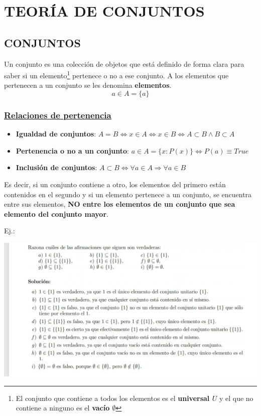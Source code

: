 \documentclass[10pt,a4paper,openright]{book}
\begin{document}
\chapter*{TEORÍA DE CONJUNTOS}
\section*{CONJUNTOS}
Un conjunto es una colección de objetos que está definido de forma clara para saber si un elemento\footnote{El conjunto que contiene a todos los elementos es el \textbf{universal $U$} y el que no contiene a ninguno es el \textbf{vacío $\emptyset$}} pertenece o no a ese conjunto. A los elementos que pertenecen a un conjunto se les denomina \textbf{elementos}.
$$a\in A=\{a\}$$

\subsection*{\underline{Relaciones de pertenencia}}
\begin{itemize}
\item \textbf{Igualdad de conjuntos}: $A=B\Leftrightarrow x\in A\Leftrightarrow x\in B\Leftrightarrow A\subset B\wedge B\subset A$
\item \textbf{Pertenencia o no a un conjunto}: $a\in A=\{x: P(x)\}\Leftrightarrow P(a)\equiv True$
\item \textbf{Inclusión de conjuntos}: $A\subset B\Leftrightarrow \forall a\in A\Rightarrow \forall a\in B$
\end{itemize}

Es decir, si un conjunto contiene a otro, los elementos del primero están contenidos en el segundo y si un elemento pertenece a un conjunto, se encuentra entre sus elementos, \textbf{NO entre los elementos de un conjunto que sea elemento del conjunto mayor}.\par
Ej.:\par

\begin{center}
\includegraphics[scale=0.60]{Ejemplo 1}
\end{center}
\end{document}
